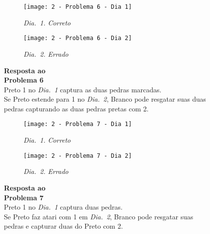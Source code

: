 \begin{SCfigure}[][h!]
    \begin{subfigure}[t]{.31\textwidth}
        \texttt{[image: 2 - Problema 6 - Dia 1]}
        \captionsetup{justification=centering}
        \caption*{\emph{Dia.\@~1. Correto}}
    \end{subfigure}
    \hfill
    \begin{subfigure}[t]{.31\textwidth}
        \texttt{[image: 2 - Problema 6 - Dia 2]}
        \captionsetup{justification=centering}
        \caption*{\emph{Dia.\@~2. Errado}}
    \end{subfigure}
    \hfill
    \caption*{\textbf{Resposta ao\\Problema 6}\\\vspace*{.25cm}Preto 1 no \emph{Dia.\@~1} captura as duas pedras marcadas.\\\vspace*{.25cm}Se Preto estende para 1 no \emph{Dia.\@~2}, Branco pode resgatar suas duas pedras capturando as duas pedras pretas com 2.}
\end{SCfigure}

\pagebreak

\begin{SCfigure}[][h!]
    \begin{subfigure}[t]{.31\textwidth}
        \texttt{[image: 2 - Problema 7 - Dia 1]}
        \captionsetup{justification=centering}
        \caption*{\emph{Dia.\@~1. Correto}}
    \end{subfigure}
    \hfill
    \begin{subfigure}[t]{.31\textwidth}
        \texttt{[image: 2 - Problema 7 - Dia 2]}
        \captionsetup{justification=centering}
        \caption*{\emph{Dia.\@~2. Errado}}
    \end{subfigure}
    \hfill
    \caption*{\textbf{Resposta ao\\Problema 7}\\\vspace*{.25cm}Preto 1 no \emph{Dia.\@~1} captura duas pedras.\\\vspace*{.25cm}Se Preto faz atari com 1 em \emph{Dia.\@~2}, Branco pode resgatar suas pedras e capturar duas do Preto com 2.}
\end{SCfigure}

\vfill


